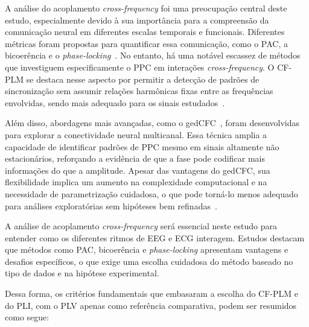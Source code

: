 A análise do acoplamento \textit{cross-frequency} foi uma preocupação central deste estudo, especialmente devido à sua importância para a compreensão da comunicação neural em diferentes escalas temporais e funcionais. Diferentes métricas foram propostas para quantificar essa comunicação, como o PAC, a bicoerência e o \textit{phase-locking}~\cite{hulsemann2019quantification}. No entanto, há uma notável escassez de métodos que investiguem especificamente o PPC em interações \textit{cross-frequency}. O CF-PLM se destaca nesse aspecto por permitir a detecção de padrões de sincronização sem assumir relações harmônicas fixas entre as frequências envolvidas, sendo mais adequado para os sinais estudados~\cite{sorrentino2022detection, seraj2018cerebral, chen2023multiple}.

Além disso, abordagens mais avançadas, como o gedCFC~\cite{cohen2017where}, foram desenvolvidas para explorar a conectividade neural multicanal. Essa técnica amplia a capacidade de identificar padrões de PPC mesmo em sinais altamente não estacionários, reforçando a evidência de que a fase pode codificar mais informações do que a amplitude. Apesar das vantagens do gedCFC, sua flexibilidade implica um aumento na complexidade computacional e na necessidade de parametrização cuidadosa, o que pode torná-lo menos adequado para análises exploratórias sem hipóteses bem refinadas~\cite{cohen2017multivariate}.

A análise de acoplamento \textit{cross-frequency} será essencial neste estudo para entender como os diferentes ritmos de EEG e ECG interagem. Estudos \cite{hulsemann2019quantification} destacam que métodos como PAC, bicoerência e \textit{phase-locking} apresentam vantagens e desafios específicos, o que exige uma escolha cuidadosa do método baseado no tipo de dados e na hipótese experimental.

Dessa forma, os critérios fundamentais que embasaram a escolha do CF-PLM e do PLI, com o PLV apenas como referência comparativa, podem ser resumidos como segue:

